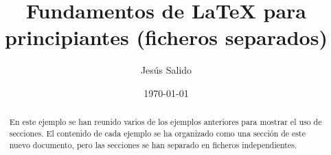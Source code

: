 \documentclass[11pt,a4paper]{article}
\author{Jesús Salido}
\title{Fundamentos de \LaTeX{} para principiantes (ficheros separados)}
\date{\today}
\begin{document}
\maketitle 

\begin{abstract}
En este ejemplo se han reunido varios de los ejemplos anteriores para mostrar el uso de secciones. El contenido de cada ejemplo se ha organizado como una sección de este nuevo documento, pero las secciones se han separado en ficheros independientes.
\end{abstract}



\end{document}
